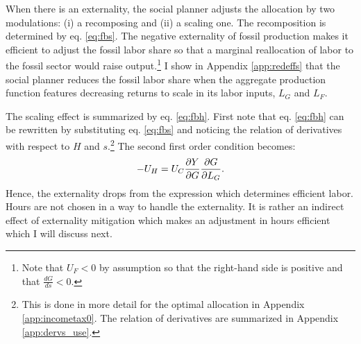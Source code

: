 When there is an externality, the social planner adjusts the allocation by two modulations: (i) a recomposing and (ii) a scaling one. 
The recomposition is determined by eq. \eqref{eq:fbs}.
The negative externality of fossil production makes it efficient to adjust the fossil labor share so that  a marginal reallocation of labor to the fossil sector would raise output.\footnote{ Note that $U_F<0$ by assumption so that the right-hand side is positive and that $\frac{dG}{ds}<0$. }
I show in Appendix \ref{app:redeffs} that the social planner reduces the fossil labor share when the aggregate production function features decreasing returns to scale in its labor inputs, $L_G$ and $L_F$.
\begin{comment}
The eq. 
\begin{align}
\frac{-U_F}{U_C \frac{dY}{dF}}=1+\frac{\frac{dY}{dG}\frac{dG}{ds}}{\frac{dY}{dF}\frac{dF}{ds}}.
\end{align}
The term on the left-hand side is the social cost of the externality: it measures what the representative household is willing to pay for a further reduction in fossil production. 
\end{comment}

The scaling effect is summarized by eq. \eqref{eq:fbh}.
First note that eq. \eqref{eq:fbh} can be rewritten by substituting eq. \eqref{eq:fbs} and noticing the relation of derivatives with respect to $H$ and $s$.\footnote{ This is done in more detail for the optimal allocation in Appendix \ref{app:incometax0}. The relation of derivatives are summarized in Appendix \ref{app:dervs_use}.}  
The second first order condition becomes:
\begin{align}\label{eq:fbh_simp}
-U_H=U_C\frac{\partial Y}{\partial G}\frac{\partial{G}}{\partial{L_G}}.
\end{align}
Hence, the externality drops from the expression which determines efficient labor. Hours are not chosen in a way to handle the externality. It is rather an indirect effect of externality mitigation which makes an adjustment in hours efficient which I will discuss next.

